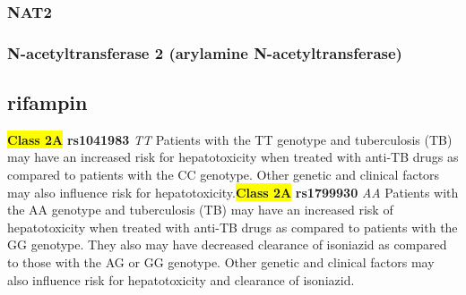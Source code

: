 \documentclass{book}
\begin{document}
\subsubsection{ NAT2 }
\subsubsection{ N-acetyltransferase 2 (arylamine N-acetyltransferase) }

\subsection{ rifampin }


\begin{center}


\textbf{\colorbox{yellow} {Class 2A}} \textbf{ rs1041983 } \textit{ TT }
Patients with the TT genotype and tuberculosis (TB) may have an increased risk for hepatotoxicity when treated with anti-TB drugs as compared to patients with the CC genotype. Other genetic and clinical factors may also influence risk for hepatotoxicity.\textbf{\colorbox{yellow} {Class 2A}} \textbf{ rs1799930 } \textit{ AA }
Patients with the AA genotype and tuberculosis (TB) may have an increased risk of hepatotoxicity when treated with anti-TB drugs as compared to patients with the GG genotype. They also may have decreased clearance of isoniazid as compared to those with the AG or GG genotype. Other genetic and clinical factors may also influence risk for hepatotoxicity and clearance of isoniazid.


\end{center}
\end{document}
